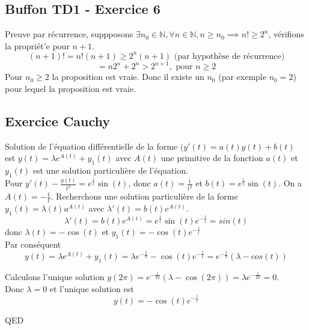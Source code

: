 \documentclass[]{book}
\theoremstyle{definition}
\newcommand{\bb}[1]{\mathbb{#1}}
\newcommand{\N}{\bb{N}}
\begin{document}
\subsection*{Buffon TD1 - Exercice 6}
Preuve par r\'ecurrence, suppposons $\exists n_0 \in \N, \forall n \in \N, n \geq n_0 \implies n! \geq 2^{n}$, v\'erifions la propri\'et'e pour $n+1$.
$$(n+1)! = n!(n+1) \geq 2^n(n+1) \text{ (par hypoth\`ese de r\'ecurrence)}$$
$$ = n2^n + 2^n > 2^{n+1}, \text{ pour } n \geq 2$$
Pour $n_0 \geq 2$ la proposition est vraie. Donc il existe un $n_0$ (par exemple $n_0 =2$) pour lequel la proposition est vraie.


\subsection*{Exercice Cauchy}
Solution de l'\'equation diff\'erentielle de la forme $(y'(t) = a(t)y(t) + b(t)$ est $y(t) = \lambda e^{A(t)}+y_1(t)$ avec $A(t)$ une primitive de la fonction $a(t)$ et $y_1(t)$ est une solution particuli\`ere de l'\'equation.\\

Pour $y'(t) - \frac{y(t)}{t^2} = e^{\frac{1}{t}}\sin(t)$, donc $a(t) = \frac{1}{t^2}$ et $b(t)= e^{\frac{1}{t}}\sin(t)$. On a $A(t) = -\frac{1}{t}$. Recherchons une  solution particuli\`ere de la forme $y_1(t) = \lambda(t)a^{A(t)}$ avec $\lambda'(t) = b(t)e^{A(t)}$.
$$\lambda'(t) = b(t)e^{A(t)} = e^{\frac{1}{t}}\sin(t)e^{-\frac{1}{t}} = sin(t)$$
donc $\lambda(t) =  -\cos(t)$ et $y_1(t) = -\cos(t)e^{-\frac{1}{t}}$\\
Par cons\'equent
$$y(t) = \lambda e^{A(t)}+y_1(t) = \lambda e^{-\frac{1}{n}} -\cos(t)e^{-\frac{1}{t}} = e^{-\frac{1}{n}}(\lambda-cos(t))$$

Calculons l'unique solution $y(2\pi) =  e^{-\frac{1}{2\pi}}(\lambda-\cos(2\pi)) = \lambda e^{-\frac{1}{2\pi}} = 0$.\\
Donc $\lambda = 0$ et l'unique solution est 
$$y(t) = -\cos(t)e^{-\frac{1}{t}}$$


QED
\end{document}
